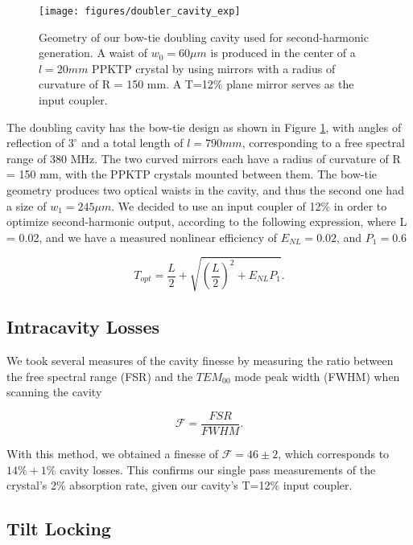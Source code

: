 \begin{figure}[ht] 
 \centering 
 \texttt{[image: figures/doubler\_cavity\_exp]} 
 \caption[Doubling cavity geometry]{Geometry of our bow-tie doubling cavity
used for second-harmonic generation.  A waist of $w_0 = 60 \mu m$ is produced
in the center of a $l=20 mm$ PPKTP crystal by using mirrors with a radius of curvature of R = 150 mm.  A T=12\% plane mirror serves as the input coupler.} 
 \label{fig:doubling_cavity} 
\end{figure}

The doubling cavity has the bow-tie design as shown in Figure
\ref{fig:doubling_cavity}, with angles of reflection of $3^\circ$ and a total length of $l = 790 mm$, corresponding to a free spectral range of 380 MHz.  The two curved mirrors each have a radius of curvature of R = 150 mm, with the PPKTP crystals mounted between them.  The bow-tie geometry produces two optical waists in the cavity, and thus the second one had a size of $w_1=245 \mu m$.  We decided to use an input coupler of 12\% in order to optimize second-harmonic output, according to the following expression, where L = 0.02, and we have a measured nonlinear efficiency of $E_{NL} = 0.02$, and $P_1 = 0.6$  \cite{letargat2005}

\begin{equation}
  \label{eq:input_coupler}
  T_{opt} = \frac{L}{2} + \sqrt{\left( \frac{L}{2} \right)^2 + E_{NL}P_1 }.
\end{equation}

\subsection{Intracavity Losses} 
\label{intracavity_losses} 
We took several measures of the cavity finesse by measuring the ratio between
the free spectral range (FSR) and the $TEM_{00}$ mode peak width (FWHM) when scanning the cavity

\begin{equation}
  \label{eq:finesse}
  \mathcal{F} = \frac{FSR}{FWHM} .
\end{equation}

\noindent
With this method, we obtained a finesse of $\mathcal{F} = 46 \pm 2$, which corresponds to $14\% + 1\%$ cavity losses.  This confirms our single pass measurements of the crystal's 2\% absorption rate, given our cavity's T=12\% input coupler.




\subsection{Tilt Locking} 
\label{tilt_locking} 

